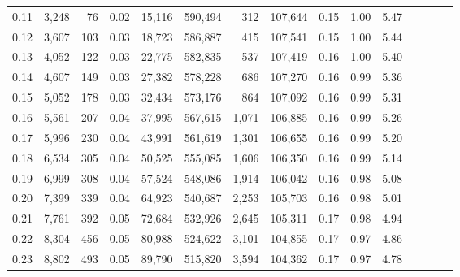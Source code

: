 \begin{tabular}{rrrcrrrrrrrrrrr}
0.11 &   3,248 &     76 &                                       0.02 &   15,116 &  590,494 &      312 &  107,644 &  0.15 &  1.00 &                         5.47 \\
0.12 &   3,607 &    103 &                                       0.03 &   18,723 &  586,887 &      415 &  107,541 &  0.15 &  1.00 &                         5.44 \\
0.13 &   4,052 &    122 &                                       0.03 &   22,775 &  582,835 &      537 &  107,419 &  0.16 &  1.00 &                         5.40 \\
0.14 &   4,607 &    149 &                                       0.03 &   27,382 &  578,228 &      686 &  107,270 &  0.16 &  0.99 &                         5.36 \\
0.15 &   5,052 &    178 &                                       0.03 &   32,434 &  573,176 &      864 &  107,092 &  0.16 &  0.99 &                         5.31 \\
0.16 &   5,561 &    207 &                                       0.04 &   37,995 &  567,615 &    1,071 &  106,885 &  0.16 &  0.99 &                         5.26 \\
0.17 &   5,996 &    230 &                                       0.04 &   43,991 &  561,619 &    1,301 &  106,655 &  0.16 &  0.99 &                         5.20 \\
0.18 &   6,534 &    305 &                                       0.04 &   50,525 &  555,085 &    1,606 &  106,350 &  0.16 &  0.99 &                         5.14 \\
0.19 &   6,999 &    308 &                                       0.04 &   57,524 &  548,086 &    1,914 &  106,042 &  0.16 &  0.98 &                         5.08 \\
0.20 &   7,399 &    339 &                                       0.04 &   64,923 &  540,687 &    2,253 &  105,703 &  0.16 &  0.98 &                         5.01 \\
0.21 &   7,761 &    392 &                                       0.05 &   72,684 &  532,926 &    2,645 &  105,311 &  0.17 &  0.98 &                         4.94 \\
0.22 &   8,304 &    456 &                                       0.05 &   80,988 &  524,622 &    3,101 &  104,855 &  0.17 &  0.97 &                         4.86 \\
0.23 &   8,802 &    493 &                                       0.05 &   89,790 &  515,820 &    3,594 &  104,362 &  0.17 &  0.97 &                         4.78 \\

\end{tabular}
